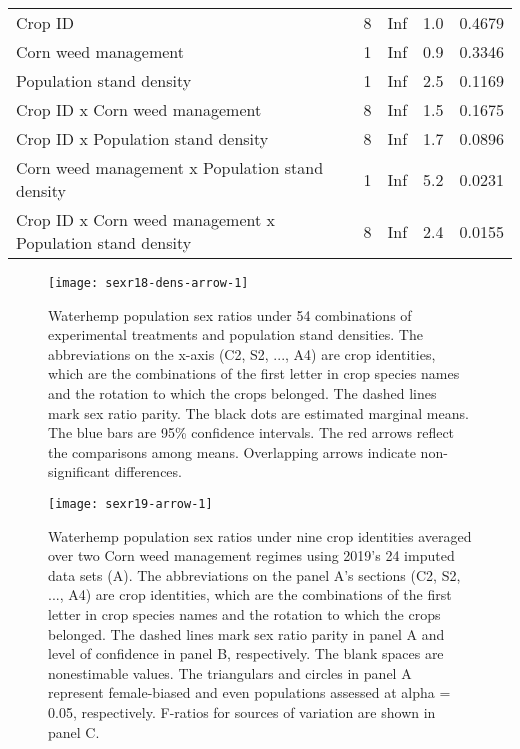 \documentclass[utf8]{frontiersSCNS}
\begin{document}
\begin{table}[htbp]
{\begin{tabular}[t]{lrrrl}
\hspace{1em}Crop ID & 8 & Inf & 1.0 & 0.4679\\
\hspace{1em}Corn weed management & 1 & Inf & 0.9 & 0.3346\\
\hspace{1em}Population stand density & 1 & Inf & 2.5 & 0.1169\\
\hspace{1em}Crop ID x Corn weed management & 8 & Inf & 1.5 & 0.1675\\
\hspace{1em}Crop ID x Population stand density & 8 & Inf & 1.7 & 0.0896\\
\hspace{1em}Corn weed management x Population stand density & 1 & Inf & 5.2 & 0.0231\\
\hspace{1em}Crop ID x Corn weed management x Population stand density & 8 & Inf & 2.4 & 0.0155\\
\bottomrule
\end{tabular}}
\end{table}

\begin{figure}
\texttt{[image: sexr18-dens-arrow-1]} \caption{Waterhemp population sex ratios under 54 combinations of experimental treatments and population stand densities. The abbreviations on the x-axis (C2, S2, ..., A4) are crop identities, which are the combinations of the first letter in crop species names and the rotation to which the crops belonged. The dashed lines mark sex ratio parity. The black dots are estimated marginal means. The blue bars are 95\% confidence intervals. The red arrows reflect the comparisons among means. Overlapping arrows indicate non-significant differences.}\label{fig:sexr18-dens-arrow}
\end{figure}

\begin{figure}[htbp]
\texttt{[image: sexr19-arrow-1]} \caption{Waterhemp population sex ratios under nine crop identities averaged over two Corn weed management regimes using 2019's 24 imputed data sets (A). The abbreviations on the panel A's sections (C2, S2, ..., A4) are crop identities, which are the combinations of the first letter in crop species names and the rotation to which the crops belonged. The dashed lines mark sex ratio parity in panel A and level of confidence in panel B, respectively. The blank spaces are nonestimable values. The triangulars and circles in panel A represent female-biased and even populations assessed at alpha = 0.05, respectively. F-ratios for sources of variation are shown in panel C.}\label{fig:sexr19-arrow}
\end{figure}
\end{document}
